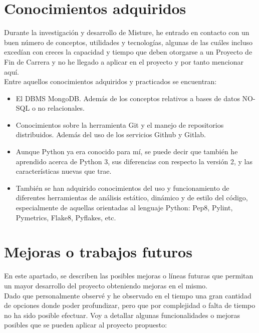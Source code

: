 \newpage
\section{Conocimientos adquiridos}


Durante la investigación y desarrollo de Misture, he entrado en contacto con un buen número de conceptos, utilidades y tecnologías, algunas de las cuáles incluso excedían con creces la capacidad y tiempo que deben otorgarse a un Proyecto de Fin de Carrera y no he llegado a aplicar en el proyecto y por tanto mencionar aquí.\\


Entre aquellos conocimientos adquiridos y practicados se encuentran:\\


\begin{itemize}
\item El DBMS MongoDB. Además de los conceptos relativos a bases de datos NO-SQL o no relacionales.

\item Conocimientos sobre la herramienta Git y el manejo de repositorios distribuidos. Además del uso de los servicios Github y Gitlab.

\item Aunque Python ya era conocido para mí, se puede decir que también he aprendido acerca de Python 3, sus diferencias con respecto la versión 2, y las características nuevas que trae.

\item También se han adquirido conocimientos del uso y funcionamiento de diferentes herramientas de análisis estático, dinámico y de estilo del código, especialmente de aquellas orientadas al lenguaje Python: Pep8, Pylint, Pymetrics, Flake8, Pyflakes, etc.

\end{itemize}

\newpage
\section{Mejoras o trabajos futuros}


En este apartado, se describen las posibles mejoras o líneas futuras que permitan un mayor desarrollo del proyecto obteniendo mejoras en el mismo.\\


Dado que personalmente observé y he observado en el tiempo una gran cantidad de opciones donde poder profundizar, pero que por complejidad o falta de tiempo no ha sido posible efectuar. Voy a detallar algunas funcionalidades o mejoras posibles que se pueden aplicar al proyecto propuesto:\\



